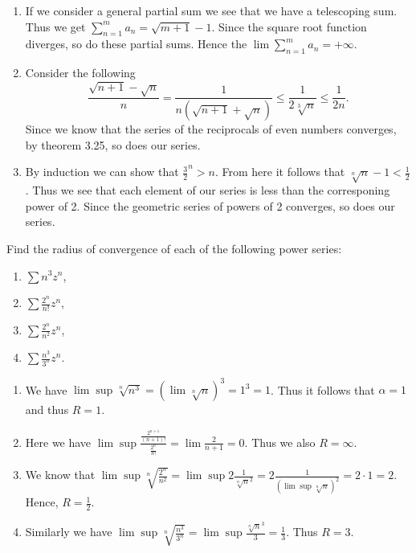 \begin{solution}
  \begin{enumerate}[label=(\alph*)]
    \item If we consider a general partial sum we see that we have a telescoping sum.
      Thus we get $\sum_{n = 1}^m a_n = \sqrt{m + 1} - 1$.
      Since the square root function diverges, so do these partial sums.
      Hence the $\lim \sum_{n = 1}^{m} a_n = + \infty$.
    \item Consider the following
      \[\frac{\sqrt{n + 1} - \sqrt{n}}{n} = \frac{1}{n (\sqrt{n + 1} + \sqrt{n})} \le \frac{1}{2 \sqrt[3]{n}} \le \frac{1}{2 n}.\]
      Since we know that the series of the reciprocals of even numbers converges, by theorem 3.25, so does our series.
    \item By induction we can show that $\frac{3}{2}^n > n$.
      From here it follows that $\sqrt[n]{n} - 1 < \frac{1}{2}$.
      Thus we see that each element of our series is less than the corresponing power of 2.
      Since the geometric series of powers of 2 converges, so does our series.
  \end{enumerate}
\end{solution}

\setcounter{problem}{8}
\begin{problem}
  Find the radius of convergence of each of the following power series:
  \begin{enumerate}[label=(\alph*)]
    \item $\sum n^3 z^n$,
    \item $\sum \frac{2^n}{n!} z^n$,
    \item $\sum \frac{2^n}{n^2} z^n$,
    \item $\sum \frac{n^3}{3^n} z^n$.
  \end{enumerate}
\end{problem}

\begin{solution}
  \begin{enumerate}[label=(\alph*)]
    \item We have $\lim \sup \sqrt[n]{n^3} = (\lim \sqrt[n]{n})^3 = 1^3 = 1$.
      Thus it follows that $\alpha = 1$ and thus $R = 1$.
    \item Here we have $\lim \sup \frac{\frac{2^{n + 1}}{(n + 1)!}}{\frac{2^n}{n!}} = \lim \frac{2}{n + 1} = 0$.
      Thus we also $R = \infty$.
    \item We know that $\lim \sup \sqrt[n]{\frac{2^n}{n^2}} = \lim \sup 2 \frac{1}{\sqrt[n]{n}^2} = 2 \frac{1}{(\lim \sup \sqrt[n]{n})^2} = 2 \cdot 1 = 2$.
      Hence, $R = \frac{1}{2}$.
    \item Similarly we have $\lim \sup \sqrt[n]{\frac{n^3}{3^n}} = \lim \sup \frac{\sqrt[n]{n}^3}{3} = \frac{1}{3}$.
      Thus $R = 3$.
  \end{enumerate}
\end{solution}

